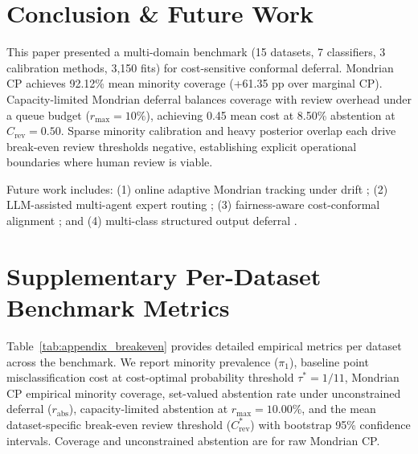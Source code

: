 \documentclass{ieeetj}
\begin{document}
\section{Conclusion \& Future Work}
\label{sec:conclusion}

This paper presented a multi-domain benchmark (15 datasets, 7 classifiers, 3 calibration methods, 3,150 fits) for cost-sensitive conformal deferral. Mondrian CP achieves 92.12\% mean minority coverage (+61.35 pp over marginal CP). Capacity-limited Mondrian deferral balances coverage with review overhead under a queue budget ($r_{\max}=10\%$), achieving 0.45 mean cost at 8.50\% abstention at $C_{\mathrm{rev}}=0.50$. Sparse minority calibration and heavy posterior overlap each drive break-even review thresholds negative, establishing explicit operational boundaries where human review is viable.

Future work includes: (1) online adaptive Mondrian tracking under drift \cite{gibbs2021adaptive}; (2) LLM-assisted multi-agent expert routing \cite{straitouri2024decision}; (3) fairness-aware cost-conformal alignment \cite{romano2020equalized}; and (4) multi-class structured output deferral \cite{cauchois2021knowing}.


\appendices
\renewcommand{\thetable}{A.\arabic{table}}
\renewcommand{\theHtable}{A.\arabic{table}}
\setcounter{table}{0}
\renewcommand{\thefigure}{A.\arabic{figure}}
\renewcommand{\theHfigure}{A.\arabic{figure}}
\setcounter{figure}{0}

\section{Supplementary Per-Dataset Benchmark Metrics}
\label{sec:appendix}

Table~\ref{tab:appendix_breakeven} provides detailed empirical metrics per dataset across the benchmark. We report minority prevalence ($\pi_1$), baseline point misclassification cost at cost-optimal probability threshold $\tau^* = 1/11$, Mondrian CP empirical minority coverage, set-valued abstention rate under unconstrained deferral ($r_{\mathrm{abs}}$), capacity-limited abstention at $r_{\max}=10.00\%$, and the mean dataset-specific break-even review threshold ($C_{\mathrm{rev}}^*$) with bootstrap 95\% confidence intervals. Coverage and unconstrained abstention are for raw Mondrian CP.
\end{document}

